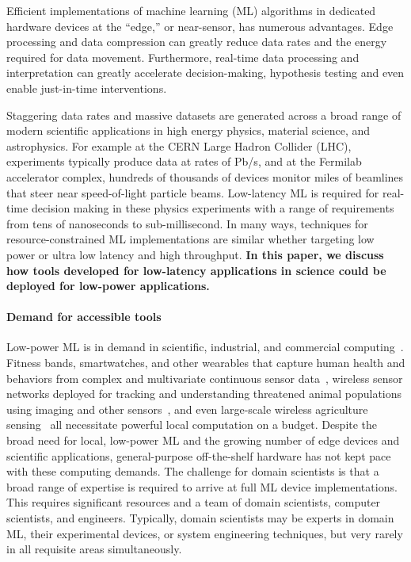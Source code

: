 \documentclass[sigconf]{acmart}
\begin{document}
Efficient implementations of machine learning (ML) algorithms in dedicated hardware devices at the ``edge,'' or near-sensor, has numerous advantages. 
Edge processing and data compression can greatly reduce data rates and the energy required for data movement. 
Furthermore, real-time data processing and interpretation can greatly accelerate decision-making, hypothesis testing and even enable just-in-time interventions.  

Staggering data rates and massive datasets are generated across a broad range of modern scientific applications in high energy physics, material science, and astrophysics. 
For example at the CERN Large Hadron Collider (LHC), experiments typically produce data at rates of Pb/s, and at the Fermilab accelerator complex, hundreds of thousands of devices monitor miles of beamlines that steer near speed-of-light particle beams. 
Low-latency ML is required for real-time decision making in these physics experiments with a range of requirements from tens of nanoseconds to sub-millisecond. 
In many ways, techniques for resource-constrained ML implementations are similar whether targeting low power or ultra low latency and high throughput.
\textbf{In this paper, we discuss how tools developed for low-latency applications in science could be deployed for low-power applications.}

\paragraph{\textbf{Demand for accessible tools}} 
Low-power ML is in demand in scientific, industrial, and commercial computing~\cite{banbury2020benchmarking}.
Fitness bands, smartwatches, and other wearables that capture human health and behaviors from complex and multivariate continuous sensor data~\cite{zhang2020necksense}, wireless sensor networks deployed for tracking and understanding threatened animal populations using imaging and other sensors~\cite{elias2017s}, and even large-scale wireless agriculture sensing~\cite{vasisht2017farmbeats} 
all necessitate powerful local computation on a budget.
Despite the broad need for local, low-power ML and the growing number of edge devices and scientific applications, general-purpose off-the-shelf hardware has not kept pace with these computing demands.
The challenge for domain scientists is that a broad range of expertise is required to arrive at full ML device implementations.
This requires significant resources and a team of domain scientists, computer scientists, and engineers.  
Typically, domain scientists may be experts in domain ML, their experimental devices, or system engineering techniques, but very rarely in all requisite areas simultaneously.
\end{document}
